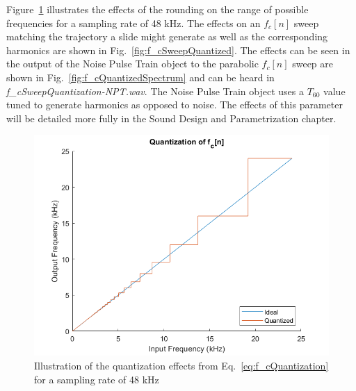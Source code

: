 \documentclass[../main.tex]{subfiles}
\begin{document}
Figure~\ref{fig:f_cQuantized} illustrates the effects of the rounding on the range of possible frequencies for a sampling rate of 48 kHz. The effects on an $f_c[n]$ sweep matching the trajectory a slide might generate as well as the corresponding harmonics are shown in Fig.~\ref{fig:f_cSweepQuantized}. The effects can be seen in the output of the Noise Pulse Train object to the parabolic $f_c[n]$ sweep are shown in Fig.~\ref{fig:f_cQuantizedSpectrum} and can be heard in \emph{f\_cSweepQuantization-NPT.wav}. The Noise Pulse Train object uses a $T_{60}$ value tuned to generate harmonics as opposed to noise. The effects of this parameter will be detailed more fully in the Sound Design and Parametrization chapter.

\begin{figure}[h]
    \centering
    \includegraphics[scale=.65]{./images/plots/f_cQuantization.png}
    \caption{Illustration of the quantization effects from Eq.~\ref{eq:f_cQuantization} for a sampling rate of 48 kHz}
    \label{fig:f_cQuantized}
\end{figure}
\end{document}
